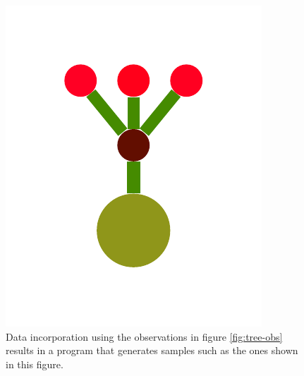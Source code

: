 \documentclass[a4paper,10pt]{article}
\begin{document}
\begin{figure}[t]
  \includegraphics[scale=.26]{../figures/vector/2-2-initProgram-9.pdf}
  \caption{Data incorporation using the observations in figure \ref{fig:tree-obs} results in a program that generates samples such as the ones shown in this figure.}
  \label{fig:initprog}
\end{figure}

\newpage
\end{document}
